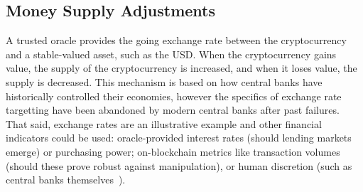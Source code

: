 



 

\subsection{Money Supply Adjustments}
\label{sec:elastic}

A trusted oracle provides the going exchange rate between the cryptocurrency and a stable-valued asset, such as the USD. When the cryptocurrency gains value, the supply of the cryptocurrency is increased, and when it loses value, the supply is decreased. This mechanism is based on how central banks have historically controlled their economies, however the specifics of exchange rate targetting have been abandoned by modern central banks after past failures. That said, exchange rates are an illustrative example and other financial indicators could be used: oracle-provided interest rates (should lending markets emerge) or purchasing power; on-blockchain metrics like transaction volumes (should these prove robust against manipulation), or human discretion (such as central banks themselves~\cite{danezis2015centrally}).

